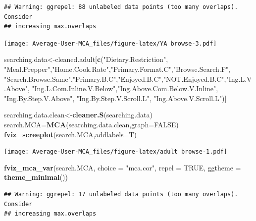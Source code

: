 \documentclass[
]{article}
\newenvironment{Shaded}{\begin{snugshade}}{\end{snugshade}}
\newcommand{\DataTypeTok}[1]{\textcolor[rgb]{0.13,0.29,0.53}{#1}}
\newcommand{\KeywordTok}[1]{\textcolor[rgb]{0.13,0.29,0.53}{\textbf{#1}}}
\newcommand{\NormalTok}[1]{#1}
\newcommand{\OtherTok}[1]{\textcolor[rgb]{0.56,0.35,0.01}{#1}}
\newcommand{\StringTok}[1]{\textcolor[rgb]{0.31,0.60,0.02}{#1}}
\begin{document}
\begin{verbatim}
## Warning: ggrepel: 88 unlabeled data points (too many overlaps). Consider
## increasing max.overlaps
\end{verbatim}

\texttt{[image: Average-User-MCA\_files/figure-latex/YA browse-3.pdf]}

\begin{Shaded}
\begin{Highlighting}[]
\NormalTok{searching.data<-cleaned.adult[}\KeywordTok{c}\NormalTok{(}\StringTok{"Dietary.Restriction"}\NormalTok{, }\StringTok{"Meal.Prepper"}\NormalTok{,}\StringTok{"Home.Cook.Rate"}\NormalTok{,}\StringTok{"Primary.Format.C"}\NormalTok{,}\StringTok{"Browse.Search.F"}\NormalTok{,}
            \StringTok{"Search.Browse.Same"}\NormalTok{,}\StringTok{"Primary.B.C"}\NormalTok{,}\StringTok{"Enjoyed.B.C"}\NormalTok{,}\StringTok{"NOT.Enjoyed.B.C"}\NormalTok{,}\StringTok{"Ing.L.V.Above"}\NormalTok{,}
            \StringTok{"Ing.L.Com.Inline.V.Below"}\NormalTok{,}\StringTok{"Ing.Above.Com.Below.V.Inline"}\NormalTok{,  }\StringTok{"Ing.By.Step.V.Above"}\NormalTok{,  }\StringTok{"Ing.By.Step.V.Scroll.L"}\NormalTok{,}
            \StringTok{"Ing.Above.V.Scroll.L"}\NormalTok{)]}

\NormalTok{searching.data.clean<-}\KeywordTok{cleaner.S}\NormalTok{(searching.data)}
\NormalTok{search.MCA=}\KeywordTok{MCA}\NormalTok{(searching.data.clean,}\DataTypeTok{graph=}\OtherTok{FALSE}\NormalTok{)}
\KeywordTok{fviz_screeplot}\NormalTok{(search.MCA,}\DataTypeTok{addlabels=}\NormalTok{T)}
\end{Highlighting}
\end{Shaded}

\texttt{[image: Average-User-MCA\_files/figure-latex/adult browse-1.pdf]}

\begin{Shaded}
\begin{Highlighting}[]
\KeywordTok{fviz_mca_var}\NormalTok{(search.MCA, }\DataTypeTok{choice =} \StringTok{"mca.cor"}\NormalTok{, }\DataTypeTok{repel =} \OtherTok{TRUE}\NormalTok{,}
             \DataTypeTok{ggtheme =} \KeywordTok{theme_minimal}\NormalTok{())}
\end{Highlighting}
\end{Shaded}

\begin{verbatim}
## Warning: ggrepel: 17 unlabeled data points (too many overlaps). Consider
## increasing max.overlaps
\end{verbatim}
\end{document}
